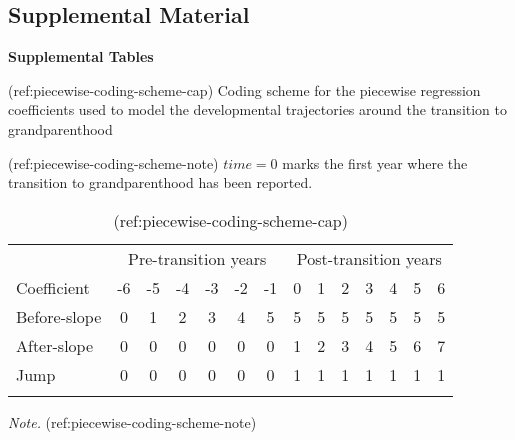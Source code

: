 \clearpage
\makeatletter
\efloat@restorefloats
\makeatother


\begin{appendix}
\renewcommand{\appendixname}{\textcolor{white}{.}}
\renewcommand{\thefigure}{S\arabic{figure}} \setcounter{figure}{0}
\renewcommand{\thetable}{S\arabic{table}} \setcounter{table}{0}

\setcounter{page}{1}

\hypertarget{supplemental-material}{%
\section{Supplemental Material}\label{supplemental-material}}

\noindent \textbf{Supplemental Tables}

(ref:piecewise-coding-scheme-cap) Coding scheme for the piecewise
regression coefficients used to model the developmental trajectories
around the transition to grandparenthood

(ref:piecewise-coding-scheme-note) \(time=0\) marks the first year where
the transition to grandparenthood has been reported.

\begin{table}[ht]

\begin{center}
\begin{threeparttable}

\caption{\label{tab:piecewise-coding-scheme}(ref:piecewise-coding-scheme-cap)}

\begin{tabular}{lccccccccccccc}
\toprule
 & \multicolumn{6}{c}{Pre-transition years} & \multicolumn{7}{c}{Post-transition years} \\
\cmidrule(r){2-7} \cmidrule(r){8-14}
Coefficient & -6 & -5 & -4 & -3 & -2 & -1 & 0 & 1 & 2 & 3 & 4 & 5 & 6\\
\midrule
Before-slope & 0 & 1 & 2 & 3 & 4 & 5 & 5 & 5 & 5 & 5 & 5 & 5 & 5\\
After-slope & 0 & 0 & 0 & 0 & 0 & 0 & 1 & 2 & 3 & 4 & 5 & 6 & 7\\
Jump & 0 & 0 & 0 & 0 & 0 & 0 & 1 & 1 & 1 & 1 & 1 & 1 & 1\\
\bottomrule
\addlinespace
\end{tabular}

\begin{tablenotes}[para]
\normalsize{\textit{Note.} (ref:piecewise-coding-scheme-note)}
\end{tablenotes}


\end{threeparttable}
\end{center}
\end{table}
\end{appendix}

